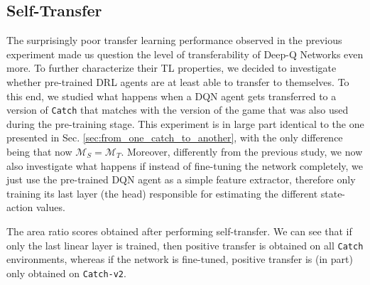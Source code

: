 



\subsection{Self-Transfer}
\label{sec:self_transfer}

The surprisingly poor transfer learning performance observed in the previous experiment made us question the level of transferability of Deep-Q Networks even more. To further characterize their TL properties, we decided to investigate whether pre-trained DRL agents are at least able to transfer to themselves. To this end, we studied what happens when a DQN agent gets transferred to a version of \texttt{Catch} that matches with the version of the game that was also used during the pre-training stage. This experiment is in large part identical to the one presented in Sec. \ref{sec:from_one_catch_to_another}, with the only difference being that now $\mathcal{M}_S = \mathcal{M}_T$. Moreover, differently from the previous study, we now also investigate what happens if instead of fine-tuning the network completely, we just use the pre-trained DQN agent as a simple feature extractor, therefore only training its last layer (the head) responsible for estimating the different state-action values. 
\begin{table}[ht!]
	\centering
	\caption{The area ratio scores obtained after performing self-transfer. We can see that if only the last linear layer is trained, then positive transfer is obtained on all \texttt{Catch} environments, whereas if the network is fine-tuned, positive transfer is (in part) only obtained on \texttt{Catch-v2}.}
	
	\label{tab:self_tl_area_ratio}
\end{table}
